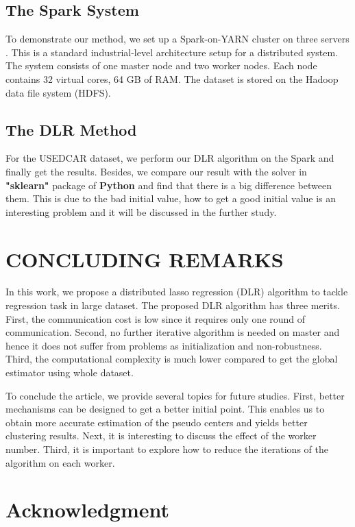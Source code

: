 \documentclass[11pt,en,authoryear]{elegantpaper}
\numberwithin{equation}{section}
\begin{document}
\subsection{The Spark System}

To demonstrate our method, we set up a Spark-on-YARN cluster on three servers . This is a standard industrial-level architecture setup for a distributed system. The system consists of one master node and two worker nodes. Each node contains 32 virtual cores, 64 GB of RAM. The dataset is stored on the Hadoop data file system (HDFS).

\subsection{The DLR Method}

For the USEDCAR dataset, we perform our DLR algorithm on the Spark and finally get the results. Besides, we compare our result with the solver in \textbf{"sklearn"} package of \textbf{Python} and find that there is a big difference between them. This is due to the bad initial value, how to get a good initial value is an interesting problem and it will be discussed in the further study.

\section{CONCLUDING REMARKS}\label{sec:6}

In this work, we propose a distributed lasso regression (DLR) algorithm to tackle regression task in large dataset. The proposed DLR algorithm has three merits. First, the communication cost is low since it requires only one round of communication. Second, no further iterative algorithm is needed on master and hence it does not suffer from problems as initialization and non-robustness. Third, the computational complexity is much lower compared to get the global estimator using whole dataset. 

To conclude the article, we provide several topics for future studies. First, better mechanisms can be designed to get a better initial point. This enables us to obtain more accurate estimation of the pseudo centers and yields better clustering results. Next, it is interesting to discuss the effect of the worker number. Third, it is important to explore how to reduce the iterations of the algorithm on each worker.

\section*{Acknowledgment}\label{acknowledgment}
\end{document}
